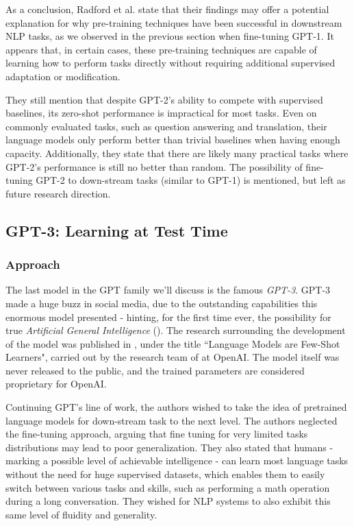 \documentclass{article}
\begin{document}
\medskip
\noindent
As a conclusion, Radford et al. state that their findings may offer a potential explanation for why pre-training techniques have been successful in downstream NLP tasks, as we observed in the previous section when fine-tuning GPT-1. It appears that, in certain cases, these pre-training techniques are capable of learning how to perform tasks directly without requiring additional supervised adaptation or modification.

\medskip
\noindent
They still mention that despite GPT-2's ability to compete with supervised baselines, its zero-shot performance is impractical for most tasks. Even on commonly evaluated tasks, such as question answering and translation, their language models only perform better than trivial baselines when having enough capacity. Additionally, they state that there are likely many practical tasks where GPT-2's performance is still no better than random. The possibility of fine-tuning GPT-2 to down-stream tasks (similar to GPT-1) is mentioned, but left as future research direction.



\subsection{GPT-3: Learning at Test Time}
\label{sec:gpt3}

\subsubsection{Approach}
\label{subsec:gpt3-approach}

The last model in the GPT family we'll discuss is the famous \emph{GPT-3}. GPT-3 made a huge buzz in social media, due to the outstanding capabilities this enormous model presented - hinting, for the first time ever, the possibility for true \emph{Artificial General Intelligence} (\citet{goertzel2014agi}). The research surrounding the development of the model was published in \citeyear{brown2020gpt3}, under the title ``Language Models are Few-Shot Learners", carried out by the research team of \citet{brown2020gpt3} at OpenAI. The model itself was never released to the public, and the trained parameters are considered proprietary for OpenAI.

\medskip
\noindent
Continuing GPT's line of work, the authors wished to take the idea of pretrained language models for down-stream task to the next level. The authors neglected the fine-tuning approach, arguing that fine tuning for very limited tasks distributions may lead to poor generalization. They also stated that humans - marking a possible level of achievable intelligence - can learn most language tasks without the need for huge supervised datasets, which enables them to easily switch between various tasks and skills, such as performing a math operation during a long conversation. They wished for NLP systems to also exhibit this same level of fluidity and generality.
\end{document}
